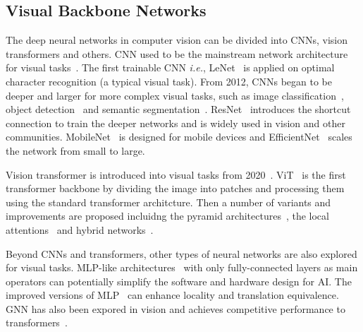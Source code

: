 \documentclass{article}
\newcommand{\ie}{\emph{i.e.}}
\begin{document}
\subsection{Visual Backbone Networks}
The deep neural networks in computer vision can be divided into CNNs, vision transformers and others. CNN used to be the mainstream network architecture for visual tasks~\cite{lecun1998gradient,alexnet,resnet}. The first trainable CNN \ie, LeNet~\cite{lecun1998gradient} is applied on optimal character recognition (a typical visual task). From 2012, CNNs began to be deeper and larger for more complex visual tasks, such as image classification~\cite{alexnet}, object detection~\cite{fasterRCNN} and semantic segmentation~\cite{fcn}. ResNet~\cite{resnet} introduces the shortcut connection to train the deeper networks and is widely used in vision and other communities. MobileNet~\cite{mobilenet} is designed for mobile devices and EfficientNet~\cite{efficientnet} scales the network from small to large.

Vision transformer is introduced into visual tasks from 2020~\cite{vit-survey,vit,detr}. ViT~\cite{vit} is the first transformer backbone by dividing the image into patches and processing them using the standard transformer architcture. Then a number of variants and improvements are proposed incluidng the pyramid architectures~\cite{pvt,swin}, the local attentions~\cite{tnt,swin} and hybrid networks~\cite{guo2022cmt,metaformer}.

Beyond CNNs and transformers, other types of neural networks are also explored for visual tasks. MLP-like architectures~\cite{mixer,resmlp} with only fully-connected layers as main operators can potentially simplify the software and hardware design for AI. The improved versions of MLP~\cite{cyclemlp,asmlp,hire,wavemlp} can enhance locality and translation equivalence. GNN has also been expored in vision and achieves competitive performance to transformers~\cite{vig}.
\end{document}
